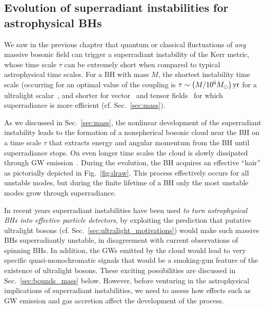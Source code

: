 \documentclass[11pt]{article}
\numberwithin{equation}{section} %
\begin{document}
\subsection{Evolution of superradiant instabilities for astrophysical BHs}\label{sec:evolution}
We saw in the previous chapter that quantum or classical fluctuations of \emph{any} massive bosonic field can trigger a superradiant instability of the Kerr metric, whose time scale $\tau$ can be extremely short when compared to typical astrophysical time scales. For a BH with mass $M$, the shortest instability time scale (occurring for an optimal value of the coupling is $\tau\sim \left(M/10^6 M_\odot\right){\rm yr}$ for a ultralight scalar~\cite{Cardoso:2005vk,Dolan:2007mj,Pani:2012vp,Witek:2012tr,Brito:2013wya}, and shorter for vector~\cite{Pani:2012vp,Pani:2012bp,Witek:2012tr} and tensor fields~\cite{Brito:2013wya} for which superradiance is more efficient (cf. Sec.~\ref{sec:mass}).


As we discussed in Sec.~\ref{sec:mass}, the nonlinear development of the superradiant instability leads to the formation of a nonspherical bosonic cloud near the BH on a time scale $\tau$ that extracts energy and angular momentum from the BH until superradiance stops. On even longer time scales the cloud is slowly dissipated through GW emission~\cite{Arvanitaki:2009fg,Arvanitaki:2010sy, Witek:2012tr,Okawa:2014nda,Cardoso:2013krh,Brito:2014wla,Yoshino:2015nsa,Brito:2017zvb,East:2017ovw,East:2018glu}. During the evolution, the BH acquires an effective ``hair'' as pictorially depicted in Fig.~\ref{fig:draw}. This process effectively occurs for all unstable modes, but during the finite lifetime of a BH only the most unstable modes grow through superradiance.



In recent years superradiant instabilities have been used \emph{to turn astrophysical BHs into effective particle detectors}, by exploiting the prediction that putative ultralight bosons (cf. Sec.~\ref{sec:ultralight_motivations}) would make such massive BHs superradiantly unstable, in disagreement with current observations of spinning BHs. In addition, the GWs emitted by the cloud would lead to very specific quasi-monochromatic signals that would be a smoking-gun feature of the existence of ultralight bosons. These exciting possibilities are discussed in Sec.~\ref{sec:bounds_mass} below. 
However, before venturing in the astrophysical implications of superradiant instabilities, we need to assess how effects such as GW emission and gas accretion affect the development of the process.
\end{document}
